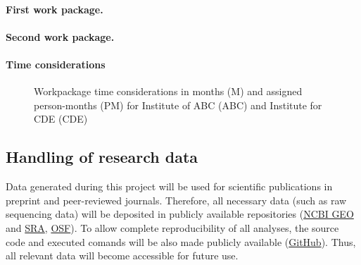 \documentclass{scrartcl}
\begin{document}
\hrulefill
\paragraph{First work package.}
\label{wp:1}



\hrulefill
\paragraph{Second work package.}
\label{wp:2}





\let\theparagraph=\oldpara
\paragraph*{Time considerations}
\vspace{-0.5cm}
\begin{figure}[h]
	\centering
  	\resizebox{\textwidth}{!}{}
	\caption{Workpackage time considerations in months (M) and assigned person-months (PM) for Institute of ABC (ABC) and Institute for CDE (CDE)}
	\label{fig:timeline}
\end{figure}

\subsection{Handling of research data}
Data generated during this project will be used for scientific publications in
preprint and peer-reviewed journals. Therefore, all necessary data (such as raw
sequencing data) will be deposited in publicly available repositories
(\href{https://www.ncbi.nlm.nih.gov/geo/}{NCBI GEO} and
\href{https://www.ncbi.nlm.nih.gov/sra}{SRA}, \href{https://osf.io/}{OSF}). To
allow complete reproducibility of all analyses, the source code and executed
comands will be also made publicly available
(\href{https://github.com/}{GitHub}).  Thus, all relevant data will become
accessible for future use. 
\end{document}
